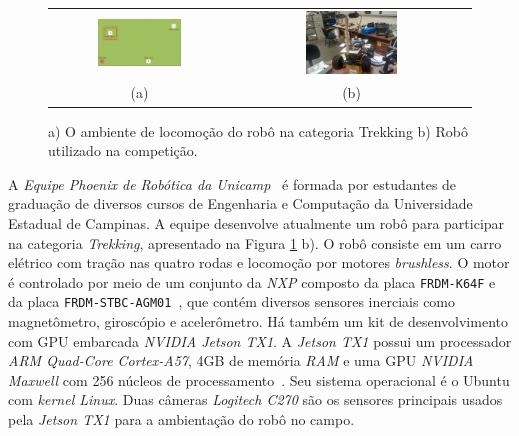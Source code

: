 \documentclass[11pt]{article}
\newcommand{\tit}[1]{\textit{#1}}
\newcommand{\ttt}[1]{\texttt{#1}}
\begin{document}
\begin{figure}[hbnt]
\begin{center}
		\begin{tabular} {cc}
		\includegraphics[width=0.49\textwidth]{imgs/trekking_campo.png} &
		\includegraphics[width=0.4\textwidth]{imgs/piranha.jpg} \\
		(a) & (b) \\
		\end{tabular}
\end{center}
\caption{a) O ambiente de locomoção do robô na categoria Trekking b) Robô utilizado na competição.}
\label{fig:ambiente}
\end{figure}


A \emph{Equipe Phoenix de Robótica da Unicamp}~\cite{phoenix} 
é formada por estudantes de graduação de diversos cursos de 
Engenharia e Computação da Universidade Estadual de Campinas. 
A equipe desenvolve atualmente um robô para participar na categoria 
\tit{Trekking}, apresentado na Figura \ref{fig:ambiente} b).
O robô consiste em um carro elétrico com tração nas quatro rodas e 
locomoção por motores \tit{brushless}.
O motor é controlado por meio de um conjunto da \tit{NXP} composto da placa
\ttt{FRDM-K64F} e da placa \ttt{FRDM-STBC-AGM01}~\cite{nxp}, que contém 
diversos sensores inerciais como magnetômetro, giroscópio e acelerômetro.
Há também um kit de desenvolvimento com GPU embarcada \tit{NVIDIA Jetson TX1}. 
A \tit{Jetson TX1} possui um processador \tit{ARM Quad-Core Cortex-A57},
4GB de memória \tit{RAM} e uma GPU \tit{NVIDIA Maxwell} com 256 núcleos de
processamento~\cite{tx1}. 
Seu sistema operacional é o Ubuntu com \tit{kernel Linux}.
Duas câmeras \tit{Logitech C270} são os sensores
principais usados pela \tit{Jetson TX1} para a ambientação do robô no campo.
\end{document}
